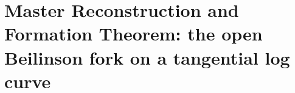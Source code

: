 
\providecommand{\Bbarch}{\bar{B}^{\mathrm{ch}}}
\providecommand{\Omegach}{\Omega^{\mathrm{ch}}}
\providecommand{\Kosz}{\mathsf{Kosz}}
\providecommand{\KSDual}{\mathsf{KSDual}}
\providecommand{\ChirHoch}{\mathrm{ChirHoch}}
\providecommand{\DerZch}{Z^{\mathrm{der}}_{\mathrm{ch}}}
\providecommand{\SCchtop}{\mathsf{SC}^{\mathrm{ch,top}}}
\providecommand{\Ass}{\mathrm{Ass}}
\providecommand{\Ran}{\mathrm{Ran}}
\providecommand{\End}{\mathrm{End}}
\providecommand{\Av}{\mathrm{av}}
\providecommand{\Tw}{\mathrm{Tw}}
\providecommand{\BKM}{\mathrm{BKM}}
\providecommand{\hCS}{\mathrm{hCS}}
\providecommand{\Tr}{\mathrm{Tr}}
\providecommand{\SpCh}{\mathrm{Sp}^{\mathrm{ch}}}
\providecommand{\PhiFA}{\Phi^{\mathrm{FA}}}
\providecommand{\Mbar}{\overline{M}}
\providecommand{\fact}{\mathrm{fact}}
\providecommand{\aug}{\mathrm{aug}}
\providecommand{\comp}{\mathrm{comp}}
\providecommand{\op}{\mathrm{op}}

\chapter[Master Reconstruction and Formation Theorem]%
{Master Reconstruction and Formation Theorem: the open Beilinson fork on a tangential
log curve}
\label{ch:master-reconstruction}

